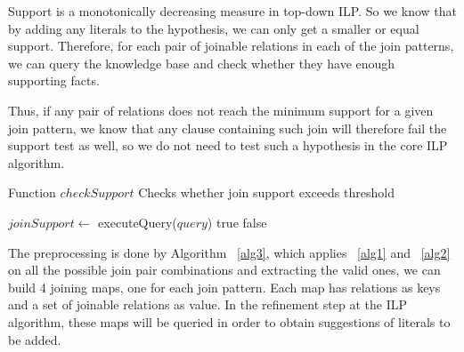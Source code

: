 Support is a monotonically decreasing measure in top-down ILP. So we know that by adding any
literals to the hypothesis, we can only get a smaller or equal support. Therefore, for each pair of joinable relations
in each of the join patterns, we can query the knowledge base and check whether they have enough supporting facts.

Thus, if any pair of relations does not reach the minimum support for a given join pattern, we know that any clause
containing such join will therefore fail the support test as well, so we do not need to test such a hypothesis in the
core ILP algorithm.

\begin{algorithm}[h!]
  \caption{Function $checkSupport$ \newline Checks whether join support exceeds threshold}
  \label{alg2}
     {
    }
    $joinSupport \leftarrow$ executeQuery($query$)\;
      {
      \Return true\;
    }{
      \Return false\;
    }
\end{algorithm}


The preprocessing is done by Algorithm ~\ref{alg3}, which applies ~\ref{alg1} and ~\ref{alg2} on all the possible join
pair combinations and extracting the valid ones, we can build 4 joining maps, one for each join pattern. Each map has
relations as keys and a set of joinable relations as value. In the refinement step at the ILP algorithm, these maps
will
be queried in order to obtain suggestions of literals to be
added.

